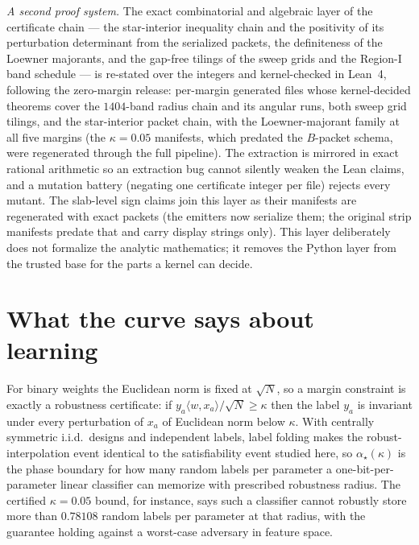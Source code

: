\documentclass[11pt]{article}
\theoremstyle{remark}
\begin{document}
\emph{A second proof system.}  The exact combinatorial and algebraic
layer of the certificate chain --- the star-interior inequality chain
and the positivity of its perturbation determinant from the
serialized packets, the definiteness of the Loewner majorants, and
the gap-free tilings of the sweep grids and the Region-I band
schedule --- is re-stated over the integers and kernel-checked in
Lean~4, following the zero-margin release: per-margin generated files
whose kernel-decided theorems cover the $1404$-band radius
chain and its angular runs, both sweep grid tilings, and the
star-interior packet chain, with the Loewner-majorant family at all
five margins (the $\kappa=0.05$ manifests, which predated the
$B$-packet schema, were regenerated through the full pipeline).  The
extraction is mirrored in exact
rational arithmetic so an extraction bug cannot silently weaken the
Lean claims, and a mutation battery (negating one certificate
integer per file) rejects every mutant.  The slab-level sign claims
join this layer as their manifests are regenerated with exact
packets (the emitters now serialize them; the original strip
manifests predate that and carry display strings only).  This layer
deliberately does not formalize the analytic mathematics; it removes
the Python layer from the trusted base for the parts a kernel can
decide.

\section{What the curve says about learning}\label{sec:ml}

For binary weights the Euclidean norm is fixed at $\sqrt N$, so a
margin constraint is exactly a robustness certificate: if
$y_a\langle w,x_a\rangle/\sqrt N\ge\kappa$ then the label $y_a$ is
invariant under every perturbation of $x_a$ of Euclidean norm below
$\kappa$.  With centrally symmetric i.i.d.\ designs and independent
labels, label folding makes the robust-interpolation event identical
to the satisfiability event studied here, so $\alpha_\star(\kappa)$
is the phase boundary for how many random labels per parameter a
one-bit-per-parameter linear classifier can memorize with prescribed
robustness radius.  The certified $\kappa=0.05$ bound, for instance,
says such a classifier cannot robustly store more than $0.78108$
random labels per parameter at that radius, with the guarantee
holding against a worst-case adversary in feature space.
\end{document}
